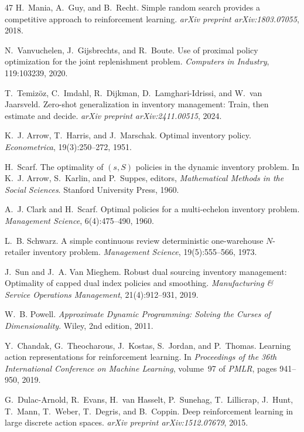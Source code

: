 \documentclass[11pt]{article}
\begin{document}
\begin{thebibliography}{47}
H.~Mania, A.~Guy, and B.~Recht.
Simple random search provides a competitive approach to reinforcement learning.
\emph{arXiv preprint arXiv:1803.07055}, 2018.

N.~Vanvuchelen, J.~Gijsbrechts, and R.~Boute.
Use of proximal policy optimization for the joint replenishment problem.
\emph{Computers in Industry}, 119:103239, 2020.

T.~Temiz\"oz, C.~Imdahl, R.~Dijkman, D.~Lamghari-Idrissi, and W.~van Jaarsveld.
Zero-shot generalization in inventory management: Train, then estimate and decide.
\emph{arXiv preprint arXiv:2411.00515}, 2024.

K.~J. Arrow, T.~Harris, and J.~Marschak.
Optimal inventory policy.
\emph{Econometrica}, 19(3):250--272, 1951.

H.~Scarf.
The optimality of $(s,S)$ policies in the dynamic inventory problem.
In K.~J. Arrow, S.~Karlin, and P.~Suppes, editors, \emph{Mathematical Methods in the Social Sciences}. Stanford University Press, 1960.

A.~J. Clark and H.~Scarf.
Optimal policies for a multi-echelon inventory problem.
\emph{Management Science}, 6(4):475--490, 1960.

L.~B. Schwarz.
A simple continuous review deterministic one-warehouse $N$-retailer inventory problem.
\emph{Management Science}, 19(5):555--566, 1973.

J.~Sun and J.~A. Van Mieghem.
Robust dual sourcing inventory management: Optimality of capped dual index policies and smoothing.
\emph{Manufacturing \& Service Operations Management}, 21(4):912--931, 2019.

W.~B. Powell.
\emph{Approximate Dynamic Programming: Solving the Curses of Dimensionality}.
Wiley, 2nd edition, 2011.

Y.~Chandak, G.~Theocharous, J.~Kostas, S.~Jordan, and P.~Thomas.
Learning action representations for reinforcement learning.
In \emph{Proceedings of the 36th International Conference on Machine Learning}, volume~97 of \emph{PMLR}, pages 941--950, 2019.

G.~Dulac-Arnold, R.~Evans, H.~van Hasselt, P.~Sunehag, T.~Lillicrap, J.~Hunt, T.~Mann, T.~Weber, T.~Degris, and B.~Coppin.
Deep reinforcement learning in large discrete action spaces.
\emph{arXiv preprint arXiv:1512.07679}, 2015.


\end{thebibliography}
\end{document}
